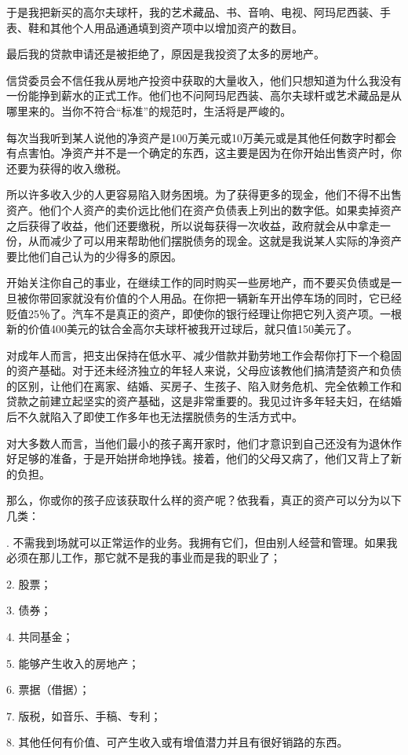 于是我把新买的高尔夫球杆，我的艺术藏品、书、音响、电视、阿玛尼西装、手表、鞋和其他个人用品通通填到资产项中以增加资产的数目。

最后我的贷款申请还是被拒绝了，原因是我投资了太多的房地产。

信贷委员会不信任我从房地产投资中获取的大量收入，他们只想知道为什么我没有一份能挣到薪水的正式工作。他们也不问阿玛尼西装、高尔夫球杆或艺术藏品是从哪里来的。当你不符合“标准”的规范时，生活将是严峻的。

每次当我听到某人说他的净资产是100万美元或10万美元或是其他任何数字时都会有点害怕。净资产并不是一个确定的东西，这主要是因为在你开始出售资产时，你还要为获得的收入缴税。

所以许多收入少的人更容易陷入财务困境。为了获得更多的现金，他们不得不出售资产。他们个人资产的卖价远比他们在资产负债表上列出的数字低。如果卖掉资产之后获得了收益，他们还要缴税，所以说每获得一次收益，政府就会从中拿走一份，从而减少了可以用来帮助他们摆脱债务的现金。这就是我说某人实际的净资产要比他们自己认为的少得多的原因。

开始关注你自己的事业，在继续工作的同时购买一些房地产，而不要买负债或是一旦被你带回家就没有价值的个人用品。在你把一辆新车开出停车场的同时，它已经贬值25％了。汽车不是真正的资产，即使你的银行经理让你把它列入资产项。一根新的价值400美元的钛合金高尔夫球杆被我开过球后，就只值150美元了。

对成年人而言，把支出保持在低水平、减少借款并勤劳地工作会帮你打下一个稳固的资产基础。对于还未经济独立的年轻人来说，父母应该教他们搞清楚资产和负债的区别，让他们在离家、结婚、买房子、生孩子、陷入财务危机、完全依赖工作和贷款之前建立起坚实的资产基础，这是非常重要的。我见过许多年轻夫妇，在结婚后不久就陷入了即使工作多年也无法摆脱债务的生活方式中。

对大多数人而言，当他们最小的孩子离开家时，他们才意识到自己还没有为退休作好足够的准备，于是开始拼命地挣钱。接着，他们的父母又病了，他们又背上了新的负担。

那么，你或你的孩子应该获取什么样的资产呢？依我看，真正的资产可以分为以下几类：

{. 不需我到场就可以正常运作的业务。我拥有它们，但由别人经营和管理。如果我必须在那儿工作，那它就不是我的事业而是我的职业了；

2. 股票；

3. 债券；

4. 共同基金；

5. 能够产生收入的房地产；

6. 票据（借据）；

7. 版税，如音乐、手稿、专利；

8. 其他任何有价值、可产生收入或有增值潜力并且有很好销路的东西。}


